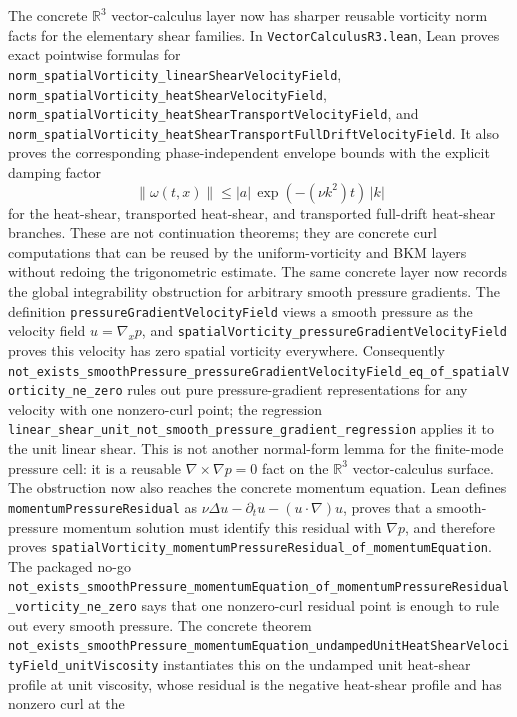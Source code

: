 \documentclass[11pt]{article}
\theoremstyle{remark}
\begin{document}
The concrete \(\mathbb{R}^3\) vector-calculus layer now has sharper reusable
vorticity norm facts for the elementary shear families.  In
\texttt{VectorCalculusR3.lean}, Lean proves exact pointwise formulas for
\texttt{norm\_spatialVorticity\_linearShearVelocityField},
\texttt{norm\_spatialVorticity\_heatShearVelocityField},
\texttt{norm\_spatialVorticity\_heatShearTransportVelocityField}, and
\texttt{norm\_spatialVorticity\_heatShearTransportFullDriftVelocityField}.
It also proves the corresponding phase-independent envelope bounds with the
explicit damping factor
\[
  \|\omega(t,x)\| \le |a|\,\exp(-(\nu k^2)t)\,|k|
\]
for the heat-shear, transported heat-shear, and transported full-drift
heat-shear branches.  These are not continuation theorems; they are concrete
curl computations that can be reused by the uniform-vorticity and BKM layers
without redoing the trigonometric estimate.
The same concrete layer now records the global integrability obstruction for
arbitrary smooth pressure gradients.  The definition
\texttt{pressureGradientVelocityField} views a smooth pressure as the velocity
field \(u=\nabla_x p\), and
\texttt{spatialVorticity\_pressureGradientVelocityField} proves this velocity
has zero spatial vorticity everywhere.  Consequently
\texttt{not\_exists\_smoothPressure\_pressureGradientVelocityField\_eq\_of\_spatialVorticity\_ne\_zero}
rules out pure pressure-gradient representations for any velocity with one
nonzero-curl point; the regression
\texttt{linear\_shear\_unit\_not\_smooth\_pressure\_gradient\_regression}
applies it to the unit linear shear.  This is not another normal-form lemma for
the finite-mode pressure cell: it is a reusable \(\nabla \times \nabla p=0\)
fact on the \(\mathbb{R}^3\) vector-calculus surface.
The obstruction now also reaches the concrete momentum equation.  Lean defines
\texttt{momentumPressureResidual} as
\(\nu\Delta u-\partial_tu-(u\cdot\nabla)u\), proves that a smooth-pressure
momentum solution must identify this residual with \(\nabla p\), and therefore
proves
\texttt{spatialVorticity\_momentumPressureResidual\_of\_momentumEquation}.
The packaged no-go
\texttt{not\_exists\_smoothPressure\_momentumEquation\_of\_momentumPressureResidual\_vorticity\_ne\_zero}
says that one nonzero-curl residual point is enough to rule out every smooth
pressure.  The concrete theorem
\texttt{not\_exists\_smoothPressure\_momentumEquation\_undampedUnitHeatShearVelocityField\_unitViscosity}
instantiates this on the undamped unit heat-shear profile at unit viscosity,
whose residual is the negative heat-shear profile and has nonzero curl at the
\end{document}
